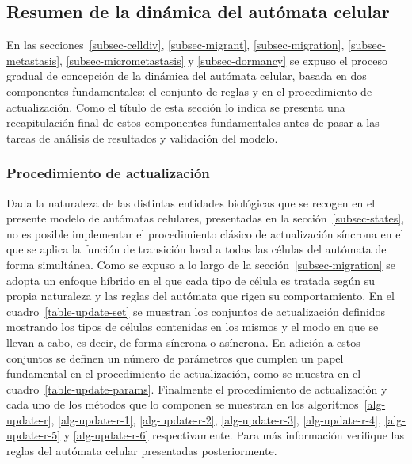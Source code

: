 \subsection{Resumen de la din\'amica del aut\'omata celular}
\label{subsec-resumen}
En las secciones~\ref{subsec-celldiv}, \ref{subsec-migrant}, \ref{subsec-migration}, \ref{subsec-metastasis}, \ref{subsec-micrometastasis} y \ref{subsec-dormancy} se expuso el proceso gradual de concepci\'on de la din\'amica del aut\'omata celular, basada en dos componentes fundamentales: el conjunto de reglas y en el procedimiento de actualizaci\'on. Como el t\'itulo de esta secci\'on lo indica se presenta una recapitulaci\'on final de estos componentes fundamentales antes de pasar a las tareas de an\'alisis de resultados y validaci\'on del modelo. 

\subsubsection{Procedimiento de actualizaci\'on}
Dada la naturaleza de las distintas entidades biol\'ogicas que se recogen en el presente modelo de aut\'omatas celulares, presentadas en la secci\'on~\ref{subsec-states}, no es posible implementar el procedimiento cl\'asico de actualizaci\'on s\'incrona en el que se aplica la funci\'on de transici\'on local a todas las c\'elulas del aut\'omata de forma simult\'anea. Como se expuso a lo largo de la secci\'on~\ref{subsec-migration} se adopta un enfoque h\'ibrido en el que cada tipo de c\'elula es tratada seg\'un su propia naturaleza y las reglas del aut\'omata que rigen su comportamiento. En el cuadro~\ref{table-update-set} se muestran los conjuntos de actualizaci\'on definidos mostrando los tipos de c\'elulas contenidas en los mismos y el modo en que se llevan a cabo, es decir, de forma s\'incrona o as\'incrona. En adici\'on a estos conjuntos se definen un n\'umero de par\'ametros que cumplen un papel fundamental en el procedimiento de actualizaci\'on, como se muestra en el cuadro~\ref{table-update-params}. Finalmente el procedimiento de actualizaci\'on y cada uno de los m\'etodos que lo componen se muestran en los algoritmos~\ref{alg-update-r}, \ref{alg-update-r-1}, \ref{alg-update-r-2}, \ref{alg-update-r-3}, \ref{alg-update-r-4}, \ref{alg-update-r-5} y \ref{alg-update-r-6} respectivamente. Para m\'as informaci\'on verifique las reglas del aut\'omata celular presentadas posteriormente.

